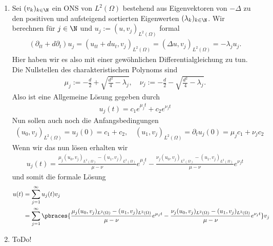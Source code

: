 \begin{solution}
\begin{enumerate}[label = (\roman*)]
    \item Sei $(v_k)_{k \in \N}$ ein ONS von $L^2(\Omega)$ bestehend aus Eigenvektoren von $- \Delta $ zu den positiven und aufsteigend sortierten Eigenwerten $(\lambda_k)_{k \in \N}$. Wir berechnen für $j \in \N$ und $u_j := (u,v_j)_{L^2(\Omega)}$ formal 
    \begin{align*}
    	(\partial_{tt} + d \partial_t)u_j = (u_{tt} + du_t, v_j)_{L^2(\Omega)} = (\Delta u, v_j)_{L^2(\Omega)} = -\lambda_j u_j.
    \end{align*}
	Hier haben wir es also mit einer gewöhnlichen Differentialgleichung zu tun. Die Nullstellen des charakteristischen Polynoms sind
	\begin{align*}
		\mu_j := - \frac{d}{2} + \sqrt{\frac{d^2}{4} - \lambda_j}, \quad \nu_j := - \frac{d}{2} - \sqrt{\frac{d^2}{4} - \lambda_j}.
	\end{align*}
	Also ist eine Allgemeine Lösung gegeben durch
	\begin{align*}
		u_j(t) = c_1 e^{\mu_j t} + c_2 e^{\nu_j t}
	\end{align*}
	Nun sollen auch noch die Anfangsbedingungen
	\begin{align*}
		(u_0, v_j)_{L^2(\Omega)} = u_j(0) = c_1 + c_2, \quad (u_1, v_j)_{L^2(\Omega)} = \partial_t u_j(0) = \mu_j c_1 + \nu_j c_2
	\end{align*}
	Wenn wir das nun lösen erhalten wir
	\begin{align*}
		u_j(t) = \frac{\mu_j(u_0, v_j)_{L^2(\Omega)} - (u_1, v_j)_{L^2(\Omega)}}{\mu - \nu} e^{\mu_j t} - \frac{\nu_j(u_0, v_j)_{L^2(\Omega)} - (u_1, v_j)_{L^2(\Omega)}}{\mu - \nu} e^{\nu_j t}
	\end{align*}
	und somit die formale Lösung
	\begin{align*}
		u(t) &= \sum_{j=1}^\infty u_j(t) v_j \\
		&= \sum_{j=1}^\infty \pbraces{\frac{\mu_j(u_0, v_j)_{L^2(\Omega)} - (u_1, v_j)_{L^2(\Omega)}}{\mu - \nu} e^{\mu_j t} - \frac{\nu_j(u_0, v_j)_{L^2(\Omega)} - (u_1, v_j)_{L^2(\Omega)}}{\mu - \nu} e^{\nu_j t}} v_j
	\end{align*}
	
	\item ToDo!
\end{enumerate}
    
\end{solution}

